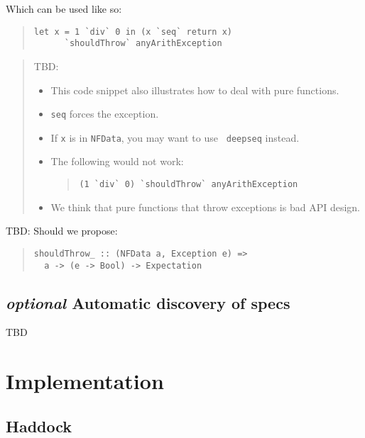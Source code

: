 \documentclass[preprint]{sigplanconf}
\begin{document}
\noindent Which can be used like so:

\begin{quote}\small\begin{verbatim}
let x = 1 `div` 0 in (x `seq` return x)
      `shouldThrow` anyArithException
\end{verbatim}\end{quote}


\begin{quote}
    TBD:
    \begin{itemize}
        \item
            This code snippet also illustrates how to deal with pure
            functions.
        \item
            {\tt seq} forces the exception.
        \item
            If {\tt x} is in {\tt NFData}, you may want to use {\tt
            deepseq} instead.
        \item
            The following would not work:
\begin{quote}\small\begin{verbatim}
(1 `div` 0) `shouldThrow` anyArithException
\end{verbatim}\end{quote}
        \item
            We think that pure functions that throw exceptions is bad
            API design.
    \end{itemize}
\end{quote}

TBD: Should we propose:
\begin{quote}\small\begin{verbatim}
shouldThrow_ :: (NFData a, Exception e) =>
  a -> (e -> Bool) -> Expectation
\end{verbatim}\end{quote}

\subsection{\emph{optional} Automatic discovery of specs}
TBD


\section{Implementation}

\subsection{Haddock}
\end{document}
